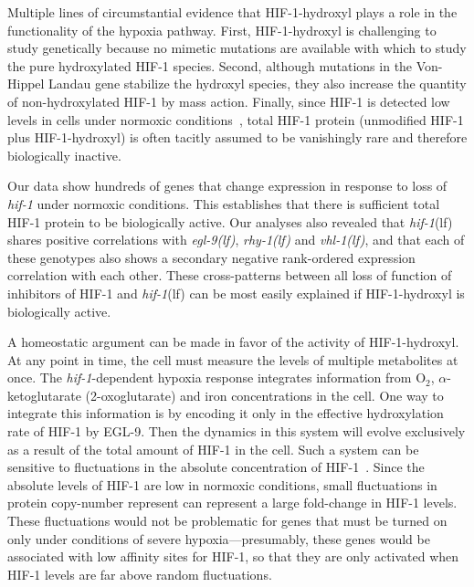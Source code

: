 \documentclass[10pt, onecolumn]{article}
\newcommand{\gene}[1]{\emph{#1}}
\newcommand{\egl}{\emph{\mbox{egl-9}(lf)}}
\newcommand{\rhy}{\emph{\mbox{rhy-1}(lf)}}
\newcommand{\vhl}{\emph{\mbox{vhl-1}(lf)}}
\newcommand{\hif}{\emph{\mbox{hif-1}}(lf)}
\newcommand{\eglp}{EGL-9}
\newcommand{\hifp}{HIF-1}
\begin{document}
Multiple lines of circumstantial evidence that \hifp{}-hydroxyl plays a role
in the functionality of the hypoxia pathway. First, \hifp{}-hydroxyl is
challenging to study genetically because no mimetic mutations are available with
which to study the pure hydroxylated \hifp{} species. Second, although mutations in
the Von-Hippel Landau gene stabilize the hydroxyl species, they also increase the
quantity of non-hydroxylated \hifp{} by mass action.
Finally, since \hifp{} is detected low levels
in cells under normoxic conditions~\cite{Wang1993}, total \hifp{} protein
(unmodified \hifp{} plus \hifp{}-hydroxyl) is often tacitly assumed to be
vanishingly rare and therefore biologically inactive.

Our data show hundreds of genes that change expression in response
to loss of \gene{hif-1} under normoxic conditions. This establishes that there is
sufficient total \hifp{} protein to be biologically active.
Our analyses also revealed that \hif{} shares
positive correlations with \egl{}, \rhy{} and \vhl{}, and that each of these genotypes
also shows a secondary negative rank-ordered expression correlation with each other.
These cross-patterns between all loss of function of inhibitors of \hifp{} and
\hif{} can be most easily explained if \hifp{}-hydroxyl is biologically active.

A homeostatic argument can be made in favor of the activity of \hifp{}-hydroxyl.
At any point in time, the cell must measure the levels of
multiple metabolites at once. The \gene{hif-1}-dependent hypoxia
response integrates information from O$_2$, $\alpha$-ketoglutarate
(2-oxoglutarate) and iron concentrations in the cell. One way to
integrate this information is by encoding it only in the effective hydroxylation
rate of \hifp{} by \eglp{}. Then the dynamics in this system will evolve
exclusively as a result of the total amount of \hifp{} in the cell. Such a system
can be sensitive to fluctuations in the absolute concentration of
\hifp{}~\cite{Goentoro2009a}. Since the absolute levels of \hifp{} are low in
normoxic conditions, small fluctuations in protein copy-number represent can
represent a large fold-change in \hifp{} levels. These fluctuations would
not be problematic for genes that must be turned on only under conditions of severe
hypoxia---presumably, these genes would be associated with low affinity
sites for \hifp{}, so that they are only activated when \hifp{} levels are far
above random fluctuations.
\end{document}
